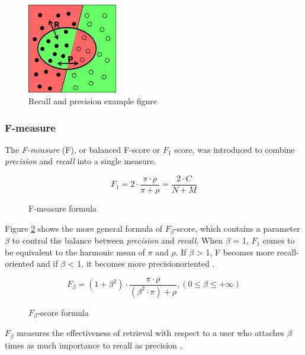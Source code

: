\begin{figure}[H]
\centering
\includegraphics[width=0.35\textwidth]{recall-precision.png}
\caption{Recall and precision example figure \cite{Wikipedia:Precision_and_recall}}
\label{fig:recall-precision}
\end{figure}

\subsubsection{F-measure}
The \textit{F-measure} (F), or  balanced F-score or $\textit{F}_\textit{1}$ score, was introduced to combine \textit{precision} and \textit{recall} into a single measure.

\begin{figure}[H]
\begin{displaymath}
	F_1 = 2 \cdot \frac{\pi \cdot \rho}{\pi + \rho} = \frac{2 \cdot C}{N + M}
\end{displaymath}
\caption{F-measure formula}
\end{figure}

Figure \ref{fig:fbeta-score} shows the more general formula of $\textit{F}_\beta$-score, which contains a parameter $\beta$ to control the balance between \textit{precision} and \textit{recall}. When $\beta$ = 1, $\textit{F}_\textit{1}$ comes to be equivalent to the harmonic mean of $\pi$ and $\rho$. If $\beta$ > 1, F becomes more recall-oriented and if $\beta$ < 1, it becomes more precisionoriented \cite{Sasaki:2007}.

\begin{figure}[H]
\begin{displaymath}
	F_\beta = (1+\beta^2) \cdot \frac{\pi \cdot \rho}{(\beta^2 \cdot \pi) + \rho}, (0 \le \beta \le +\infty)
\end{displaymath}
\caption{$\textit{F}_\beta$-score formula \cite{Chinchor:1992}}
\label{fig:fbeta-score}
\end{figure}

$\textit{F}_\beta$ measures the effectiveness of retrieval with respect to a user who attaches $\beta$ times as much importance to recall as precision \cite{Rijsbergen:1979}.

